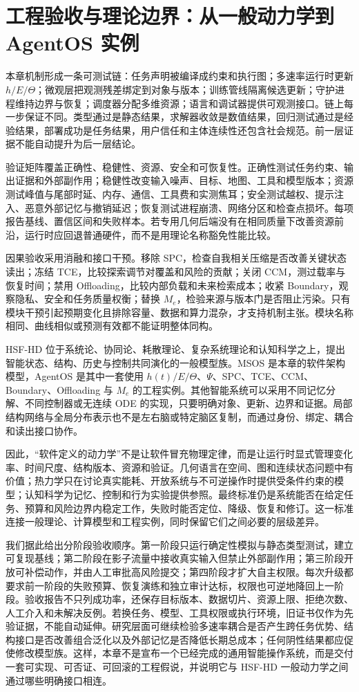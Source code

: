 \section{工程验收与理论边界：从一般动力学到 AgentOS 实例}

本章机制形成一条可测试链：任务声明被编译成约束和执行图；多速率运行时更新 $h/E/\Theta$；微观层把观测残差绑定到对象与版本；训练管线隔离候选更新；守护进程维持边界与恢复；调度器分配多维资源；语言和调试器提供可观测接口。链上每一步保证不同。类型通过是静态结果，求解器收敛是数值结果，回归测试通过是经验结果，部署成功是任务结果，用户信任和主体连续性还包含社会规范。前一层证据不能自动提升为后一层结论。

验证矩阵覆盖正确性、稳健性、资源、安全和可恢复性。正确性测试任务约束、输出证据和外部副作用；稳健性改变输入噪声、目标、地图、工具和模型版本；资源测试峰值与尾部时延、内存、通信、工具费和实测焦耳；安全测试越权、提示注入、恶意外部记忆与撤销延迟；恢复测试进程崩溃、网络分区和检查点损坏。每项报告基线、置信区间和失败样本。若专用几何后端没有在相同质量下改善资源前沿，运行时应回退普通硬件，而不是用理论名称豁免性能比较。

因果验收采用消融和接口干预。移除 SPC，检查自我相关压缩是否改善关键状态读出；冻结 TCE，比较探索调节对覆盖和风险的贡献；关闭 CCM，测过载率与恢复时间；禁用 Offloading，比较内部负载和未来检索成本；收紧 Boundary，观察隐私、安全和任务质量权衡；替换 $M_e$，检验来源与版本门是否阻止污染。只有模块干预引起预期变化且排除容量、数据和算力混杂，才支持机制主张。模块名称相同、曲线相似或预测有效都不能证明整体同构。

HSF-HD 位于系统论、协同论、耗散理论、复杂系统理论和认知科学之上，提出智能状态、结构、历史与控制共同演化的一般模型族。MSOS 是本章的软件架构模型，AgentOS 是其中一套使用 $h(t)/E/\Theta$、$\Psi$、SPC、TCE、CCM、Boundary、Offloading 与 $M_e$ 的工程实例。其他智能系统可以采用不同记忆分解、不同控制器或无连续 ODE 的实现，只要明确对象、更新、边界和证据。局部结构网络与全局分布表示也不是左右脑或特定脑区复制，而通过身份、绑定、耦合和读出接口协作。

因此，“软件定义的动力学”不是让软件冒充物理定律，而是让运行时显式管理变化率、时间尺度、结构版本、资源和验证。几何语言在空间、图和连续状态问题中有价值；热力学只在讨论真实能耗、开放系统与不可逆操作时提供受条件约束的模型；认知科学为记忆、控制和行为实验提供参照。最终标准仍是系统能否在给定任务、预算和风险边界内稳定工作，失败时能否定位、降级、恢复和修订。这一标准连接一般理论、计算模型和工程实例，同时保留它们之间必要的层级差异。

我们据此给出分阶段验收顺序。第一阶段只运行确定性模拟与静态类型测试，建立可复现基线；第二阶段在影子流量中接收真实输入但禁止外部副作用；第三阶段开放可补偿动作，并由人工审批高风险提交；第四阶段才扩大自主权限。每次升级都要求前一阶段的失败预算、恢复演练和独立审计达标，权限也可逆地降回上一阶段。验收报告不只列成功率，还保存目标版本、数据切片、资源上限、拒绝次数、人工介入和未解决反例。若换任务、模型、工具权限或执行环境，旧证书仅作为先验证据，不能自动延伸。研究层面可继续检验多速率耦合是否产生跨任务优势、结构接口是否改善组合泛化以及外部记忆是否降低长期总成本；任何阴性结果都应促使修改模型族。这样，本章不是宣布一个已经完成的通用智能操作系统，而是交付一套可实现、可否证、可回滚的工程假说，并说明它与 HSF-HD 一般动力学之间通过哪些明确接口相连。

